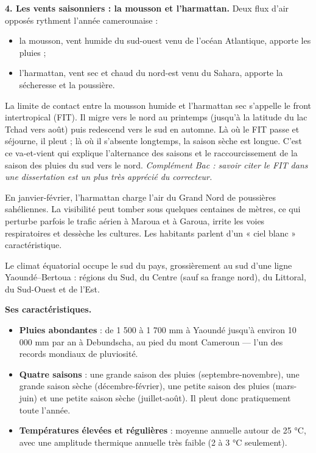 \documentclass[11pt]{article}
\newcommand{\cle}[1]{{\popxbold\color{popdark}#1}}
\newcounter{popsec}
\newcounter{popsub}
\newcommand{\courssub}[1]{%
  \stepcounter{popsub}%
  \par\vspace{9pt}\noindent{\popxbold\fontsize{11.5}{13}\selectfont\color{popink}{\color{poporange}\thepopsec.\thepopsub}\hspace{6pt}#1}\par\nopagebreak\vspace{4pt}
}
\begin{document}
\textbf{4. Les vents saisonniers : la mousson et l'harmattan.} Deux flux d'air opposés rythment l'année camerounaise :
\begin{itemize}
\item la \cle{mousson}, vent humide du sud-ouest venu de l'océan Atlantique, apporte les pluies ;
\item l'\cle{harmattan}, vent sec et chaud du nord-est venu du Sahara, apporte la sécheresse et la poussière.
\end{itemize}

\begin{propriete}
La limite de contact entre la mousson humide et l'harmattan sec s'appelle le \cle{front intertropical} (FIT). Il migre vers le nord au printemps (jusqu'à la latitude du lac Tchad vers août) puis redescend vers le sud en automne. Là où le FIT passe et séjourne, il pleut ; là où il s'absente longtemps, la saison sèche est longue. C'est ce va-et-vient qui explique l'alternance des saisons et le raccourcissement de la saison des pluies du sud vers le nord. \emph{Complément Bac : savoir citer le FIT dans une dissertation est un plus très apprécié du correcteur.}
\end{propriete}

\begin{savaistu}
En janvier-février, l'harmattan charge l'air du Grand Nord de poussières sahéliennes. La visibilité peut tomber sous quelques centaines de mètres, ce qui perturbe parfois le trafic aérien à Maroua et à Garoua, irrite les voies respiratoires et dessèche les cultures. Les habitants parlent d'un « ciel blanc » caractéristique.
\end{savaistu}

\courssub{Le climat équatorial (Sud)}

Le climat \cle{équatorial} occupe le sud du pays, grossièrement au sud d'une ligne Yaoundé–Bertoua : régions du Sud, du Centre (sauf sa frange nord), du Littoral, du Sud-Ouest et de l'Est.

\textbf{Ses caractéristiques.}
\begin{itemize}
\item \textbf{Pluies abondantes} : de 1 500 à 1 700 mm à Yaoundé jusqu'à environ 10 000 mm par an à Debundscha, au pied du mont Cameroun — l'un des records mondiaux de pluviosité.
\item \textbf{Quatre saisons} : une grande saison des pluies (septembre-novembre), une grande saison sèche (décembre-février), une petite saison des pluies (mars-juin) et une petite saison sèche (juillet-août). Il pleut donc pratiquement toute l'année.
\item \textbf{Températures élevées et régulières} : moyenne annuelle autour de 25 °C, avec une amplitude thermique annuelle très faible (2 à 3 °C seulement).
\end{itemize}
\end{document}
